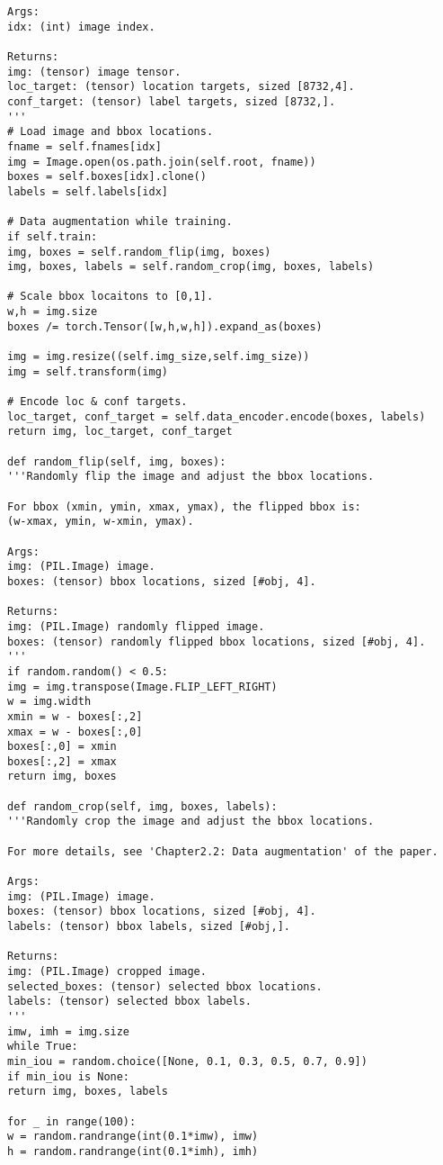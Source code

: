 \begin{lstlisting}[caption={datagen.py}]
Args:
idx: (int) image index.

Returns:
img: (tensor) image tensor.
loc_target: (tensor) location targets, sized [8732,4].
conf_target: (tensor) label targets, sized [8732,].
'''
# Load image and bbox locations.
fname = self.fnames[idx]
img = Image.open(os.path.join(self.root, fname))
boxes = self.boxes[idx].clone()
labels = self.labels[idx]

# Data augmentation while training.
if self.train:
img, boxes = self.random_flip(img, boxes)
img, boxes, labels = self.random_crop(img, boxes, labels)

# Scale bbox locaitons to [0,1].
w,h = img.size
boxes /= torch.Tensor([w,h,w,h]).expand_as(boxes)

img = img.resize((self.img_size,self.img_size))
img = self.transform(img)

# Encode loc & conf targets.
loc_target, conf_target = self.data_encoder.encode(boxes, labels)
return img, loc_target, conf_target

def random_flip(self, img, boxes):
'''Randomly flip the image and adjust the bbox locations.

For bbox (xmin, ymin, xmax, ymax), the flipped bbox is:
(w-xmax, ymin, w-xmin, ymax).

Args:
img: (PIL.Image) image.
boxes: (tensor) bbox locations, sized [#obj, 4].

Returns:
img: (PIL.Image) randomly flipped image.
boxes: (tensor) randomly flipped bbox locations, sized [#obj, 4].
'''
if random.random() < 0.5:
img = img.transpose(Image.FLIP_LEFT_RIGHT)
w = img.width
xmin = w - boxes[:,2]
xmax = w - boxes[:,0]
boxes[:,0] = xmin
boxes[:,2] = xmax
return img, boxes

def random_crop(self, img, boxes, labels):
'''Randomly crop the image and adjust the bbox locations.

For more details, see 'Chapter2.2: Data augmentation' of the paper.

Args:
img: (PIL.Image) image.
boxes: (tensor) bbox locations, sized [#obj, 4].
labels: (tensor) bbox labels, sized [#obj,].

Returns:
img: (PIL.Image) cropped image.
selected_boxes: (tensor) selected bbox locations.
labels: (tensor) selected bbox labels.
'''
imw, imh = img.size
while True:
min_iou = random.choice([None, 0.1, 0.3, 0.5, 0.7, 0.9])
if min_iou is None:
return img, boxes, labels

for _ in range(100):
w = random.randrange(int(0.1*imw), imw)
h = random.randrange(int(0.1*imh), imh)


\end{lstlisting}
